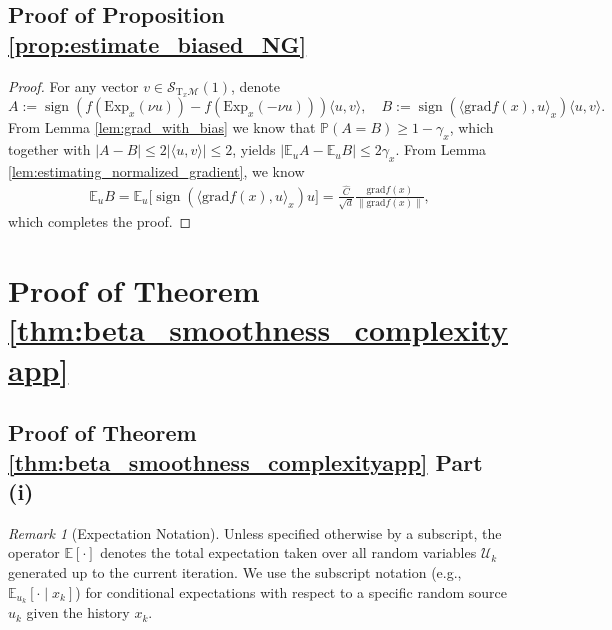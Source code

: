 \documentclass{article}
\newcommand{\rgrad}{\mathrm{grad}}
\newcommand{\pert}{\nu}
\theoremstyle{plain}
\theoremstyle{definition}
\theoremstyle{remark}
\newtheorem{remark}[theorem]{Remark}
\begin{document}
\subsection{Proof of Proposition \ref{prop:estimate_biased_NG}}
\begin{proof}\label{pf:estimate_biased_NG}
For any vector $v \in \mathcal{S}_{\mathrm{T}_x\mathcal{M}}(1)$, denote 
\[A:= \operatorname{sign}(f(\mathrm{Exp}_x( \pert u)) - f(\mathrm{Exp}_x( -\pert u)))  \langle u, v\rangle, \quad B:= \operatorname{sign}(\langle\rgrad f(x), u\rangle_x)  \langle u, v\rangle. \]
From Lemma \ref{lem:grad_with_bias} we know that $\mathbb{P}(A=B)\geq 1-\gamma_x$, which together with $|A-B|\leq 2|\langle u,v\rangle|\leq 2$, yields $|\mathbb{E}_u A-\mathbb{E}_u B|\leq 2\gamma_x$. From Lemma \ref{lem:estimating_normalized_gradient}, we know 
\begin{align*}
   \mathbb{E}_u B = \mathbb{E}_u\big[\operatorname{sign}(\langle \rgrad f(x),u\rangle_x)u\big]
= \frac{\hat{C}}{\sqrt{d}}\frac{\rgrad f(x)}{\|\rgrad f(x)\|},
\end{align*}
which completes the proof.
\end{proof}



\section{Proof of Theorem \ref{thm:beta_smoothness_complexityapp}}

\subsection{Proof of Theorem \ref{thm:beta_smoothness_complexityapp} Part (i)}\label{pf:beta_smoothness_complexity} 

\begin{remark}[Expectation Notation]
Unless specified otherwise by a subscript, the operator $\mathbb{E}[\cdot]$ denotes the total expectation taken over all random variables $\mathcal{U}_k$ generated up to the current iteration. We use the subscript notation (e.g., $\mathbb{E}_{u_k}[\cdot \mid x_k]$) for conditional expectations with respect to a specific random source $u_k$ given the history $x_k$.
\end{remark}
\end{document}
